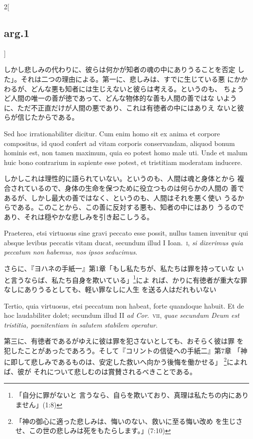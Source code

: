 \documentclass[paper=a4paper,fontsize=10pt,jafontsize=9pt,titlepage]{jlreq}
\begin{document}
\begin{paracol}{2}[\subsection{arg.1}]
\switchcolumn

しかし悲しみの代わりに、彼らは何かが知者の魂の中にありうることを否定
 した」。それは二つの理由による。第一に、悲しみは、すでに生じている悪
 にかかわるが、どんな悪も知者には生じえないと彼らは考える。というのも、
 ちょうど人間の唯一の善が徳であって、どんな物体的な善も人間の善ではな
 いように、ただ不正直だけが人間の悪であり、これは有徳者の中にはありえ
 ないと彼らが信じたからである。

\switchcolumn*

Sed hoc irrationabiliter dicitur. Cum enim homo sit ex anima et
 corpore compositus, id quod confert ad vitam corporis conservandam,
 aliquod bonum hominis est, non tamen maximum, quia eo potest homo
 male uti. Unde et malum huic bono contrarium in sapiente esse potest,
 et tristitiam moderatam inducere.

\switchcolumn

しかしこれは理性的に語られていない。というのも、人間は魂と身体とから
 複合されているので、身体の生命を保つために役立つものは何らかの人間の
 善であるが、しかし最大の善ではなく、というのも、人間はそれを悪く使い
 うるからである。このことから、この善に反対する悪も、知者の中にはあり
 うるのであり、それは穏やかな悲しみを引き起こしうる。

\switchcolumn*

Praeterea, etsi virtuosus sine gravi peccato esse possit, nullus
 tamen invenitur qui absque levibus peccatis vitam ducat, secundum
 illud I Ioan.~{\scshape i}, {\itshape si dixerimus quia peccatum non habemus, nos ipsos
 seducimus}.

\switchcolumn

さらに、『ヨハネの手紙一』第1章「もし私たちが、私たちは罪を持っていな
 いと言うならば、私たち自身を欺いている」\footnote{「自分に罪がないと
 言うなら、自らを欺いており、真理は私たちの内にありません」(1:8)}によ
 れば、かりに有徳者が重大な罪なしにありうるとしても、軽い罪なしに人生
 を送る人はだれもいない

\switchcolumn*

Tertio, quia virtuosus, etsi peccatum non habeat, forte quandoque
 habuit. Et de hoc laudabiliter dolet; secundum illud II {\itshape ad
 Cor}.~{\scshape vii}, {\itshape quae secundum Deum est tristitia,
 poenitentiam in salutem stabilem operatur}.

\switchcolumn

第三に、有徳者であるがゆえに彼は罪を犯さないとしても、おそらく彼は罪
 を犯したことがあったであろう。そして『コリントの信徒への手紙二』第7章
 「神に即して悲しみであるものは、安定した救いへ向かう後悔を働かせる」
 \footnote{「神の御心に適った悲しみは、悔いのない、救いに至る悔い改め
 を生じさせ、この世の悲しみは死をもたらします。」(7:10)}によれば、彼が
 それについて悲しむのは賞賛されるべきことである。


\end{paracol}
\end{document}
